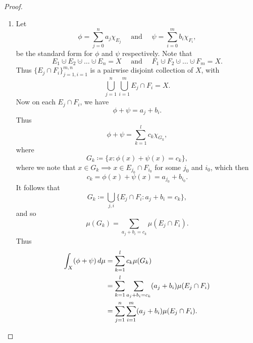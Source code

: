 \documentclass[notoc,notitlepage]{tufte-book}
\begin{document}
\begin{proof}
\begin{enumerate}
    \item Let
      \begin{equation*}
        \phi = \sum_{j=0}^{n} a_j \chi_{E_j}\quad\text{ and }\quad
        \psi = \sum_{i=0}^{m} b_i \chi_{F_i},
      \end{equation*}
      be the standard form for $\phi$ and $\psi$ respectively.
      Note that
      \begin{equation*}
        E_1 \cupdot E_2 \cupdot \hdots \cupdot E_n = X \quad\text{ and }\quad
        F_1 \cupdot F_2 \cupdot \hdots \cupdot F_m = X.
      \end{equation*}
      Thus $\{ E_j \cap F_i \}_{j=1, i=1}^{m, n}$ is a pairwise disjoint
      collection of $X$, with
      \begin{equation*}
        \bigcup_{j=1}^{n} \bigcup_{i=1}^{m} E_j \cap F_i = X.
      \end{equation*}
      Now on each $E_j \cap F_i$, we have
      \begin{equation*}
        \phi + \psi = a_j + b_i.
      \end{equation*}
      Thus
      \begin{equation*}
        \phi + \psi = \sum_{k=1}^{l} c_k \chi_{G_k},
      \end{equation*}
      where
      \begin{equation*}
        G_k \coloneqq \{ x : \phi(x) + \psi(x) = c_k \},
      \end{equation*}
      where we note that $x \in G_k \implies x \in E_{j_0} \cap F_{i_0}$
      for some $j_0$ and $i_0$, which then
      \begin{equation*}
        c_k = \phi(x) + \psi(x) = a_{j_0} + b_{i_0}.
      \end{equation*}
      It follows that
      \begin{equation*}
        G_k \coloneqq \bigcup_{j, i} \{ E_j \cap F_i : a_j + b_i = c_k \},
      \end{equation*}
      and so
      \begin{equation*}
        \mu(G_k) = \sum_{a_j + b_i = c_k} \mu(E_j \cap F_i).
      \end{equation*}
      Thus
      \begin{align*}
        \int_{X} (\phi + \psi) \dif{\mu}
        &= \sum_{k=1}^{l} c_k \mu(G_k) \\
        &= \sum_{k=1}^{l} \sum_{a_j + b_i = c_k} (a_j + b_i) \mu(E_j \cap F_i) \\
        &= \sum_{j=1}^{n} \sum_{i=1}^{m} (a_j + b_i) \mu(E_j \cap F_i).

\end{align*}
\end{enumerate}
\end{proof}
\end{document}
